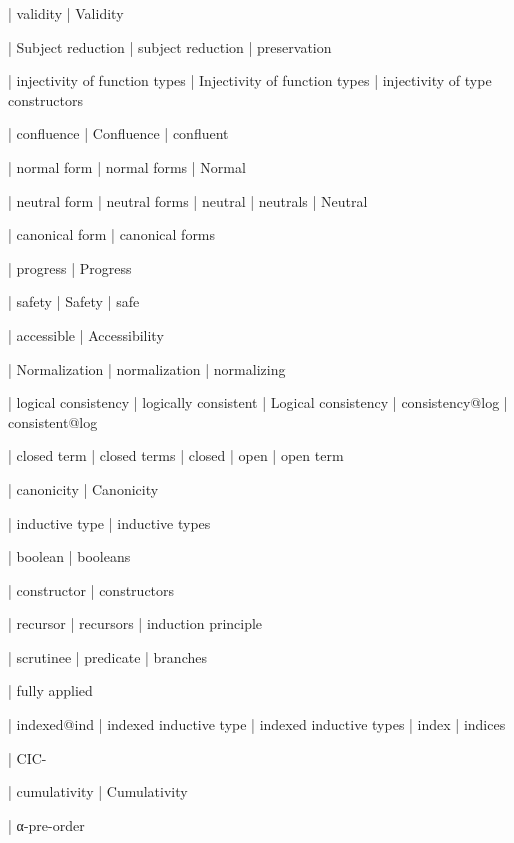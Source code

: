   | validity
  | Validity

  | Subject reduction
  | subject reduction
  | preservation

  | injectivity of function types
  | Injectivity of function types
  | injectivity of type constructors

  | confluence
  | Confluence
  | confluent

  | normal form
  | normal forms
  | Normal

  | neutral form
  | neutral forms
  | neutral
  | neutrals
  | Neutral

  | canonical form
  | canonical forms

  | progress
  | Progress

  | safety
  | Safety
  | safe

  | accessible
  | Accessibility

  | Normalization
  | normalization
  | normalizing

  | logical consistency
  | logically consistent
  | Logical consistency
  | consistency@log
  | consistent@log

  | closed term
  | closed terms
  | closed
  | open
  | open term

  | canonicity
  | Canonicity

  | inductive type
  | inductive types

  | boolean
  | booleans

  | constructor
  | constructors

  | recursor
  | recursors
  | induction principle

  | scrutinee
  | predicate
  | branches

  | fully applied

  | indexed@ind
  | indexed inductive type
  | indexed inductive types
  | index
  | indices

  | CIC-

  | cumulativity
  | Cumulativity

  | α-pre-order


